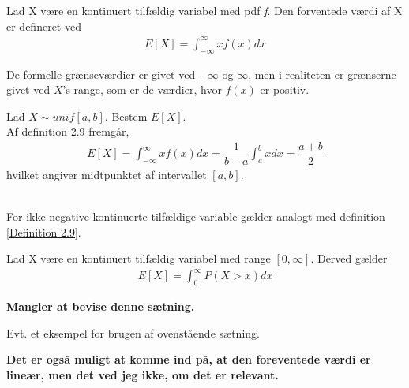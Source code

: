 \begin{minipage}\textwidth \label{Definition 2.9}
\begin{defn}\textbf{} %
\newline
Lad X være en kontinuert tilfældig variabel med pdf \textit{f}. Den forventede værdi af X er defineret ved\\
\begin{align*}
    E[X]=\int_{-\infty}^\infty xf(x)dx
\end{align*}
\end{defn}
\end{minipage}

De formelle grænseværdier er givet ved $-\infty$ og $\infty$, men i realiteten er grænserne givet ved $X$'s range, som er de  værdier, hvor $f(x)$ er positiv.\\

\begin{eks} Lad $X \sim unif[a,b]$. Bestem $E[X]$.\\
Af definition 2.9 fremgår,\\
\begin{align*}
    E[X]=\int_{-\infty}^\infty xf(x)dx = \dfrac{1}{b-a}\int_{a}^b xdx = \dfrac{a+b}{2}
\end{align*}
hvilket angiver midtpunktet af intervallet $[a,b]$.
\end{eks}
\\
For ikke-negative kontinuerte tilfældige variable gælder analogt med definition \ref{Definition 2.9}.
\begin{thmx}
Lad X være en kontinuert tilfældig variabel med range $[0,\infty].$ Derved gælder
\begin{align*}
    E[X]=\int_{0}^\infty P(X > x) dx
\end{align*}
\end{thmx}
\begin{bev}
\textbf{Mangler at bevise denne sætning.}
\end{bev}

\begin{eks}
Evt. et eksempel for brugen af ovenstående sætning.
\end{eks}

\textbf{Det er også muligt at komme ind på, at den foreventede værdi er lineær, men det ved jeg ikke, om det er relevant.}
\fi

